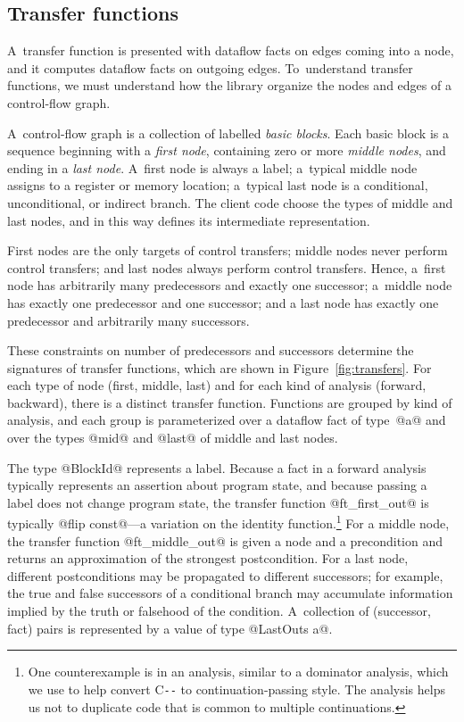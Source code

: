 \documentclass[blockstyle,preprint,natbib,nocopyrightspace]{sigplanconf}
\newcommand\PAL{\mbox{C{\texttt{-{}-}}}}
\newcommand{\authornote}[1]{{\em #1}}
\def\authornote#1{\unskip\relax}
\newcommand{\norman}[1]{\authornote{NR: #1}}
\let\remark\norman
\newcommand\secref[1]{Section~\ref{sec:#1}}
\newcommand\seclabel[1]{\label{sec:#1}}
\newcommand\figref[1]{Figure~\ref{fig:#1}}
\begin{document}
\subsection{Transfer functions} \seclabel{tffuns}

A~transfer function is presented with dataflow facts on edges coming
into a node, and it computes dataflow facts on outgoing edges.
To~understand transfer functions, we must 
understand how the library organize the nodes and edges of a control-flow graph.

\seclabel{graph.intro}

A~control-flow graph is a collection of labelled \emph{basic blocks}.
Each basic block is a sequence beginning with a \emph{first node},
containing zero or more \emph{middle nodes},
and ending in a \emph{last node}.
A~first node is always a label;
a~typical middle node assigns to a register or memory
location;
a~typical last node is a conditional, unconditional, or indirect branch.
The client code choose the types of middle and last nodes, and in this
way defines its intermediate
representation.
\remark{To say or not to say: ``(An~optimizer also works with \emph{subgraphs}, in which one or two
distinguished basic blocks may be incomplete.
Details appear in \secref{subgraphs}.)''}




First nodes are the only targets of control transfers;
middle nodes never perform control transfers;
and
last nodes always perform control transfers.
Hence, a~first node has arbitrarily many predecessors and exactly one
successor;
a~middle node has exactly one predecessor and one successor;
and a last node has exactly one predecessor and arbitrarily many
successors. 

These constraints on number of predecessors and successors determine
the signatures of 
transfer functions, 
which are shown in \figref{transfers}.
For each type of node (first, middle, last) and for each kind of
analysis (forward, backward), there is a distinct transfer function.
Functions are grouped by kind of analysis, and each group is
parameterized over a dataflow fact of type~@a@ and over the types
@mid@ and @last@ of middle and last nodes.  


The type @BlockId@ represents a label.
Because a fact in a forward analysis typically represents an assertion
about program state,
 and because passing a label does not change
program state, the transfer function @ft_first_out@ is typically 
@flip const@---a variation on
the
identity function.\footnote
{One counterexample is in an
analysis, similar to a dominator analysis,
which we use to help convert {\PAL} to continuation-passing style.
The  analysis
helps us not to duplicate code that is common to multiple continuations.
}
For a middle node, the transfer function @ft_middle_out@ is given a
node and a precondition and returns an approximation of the strongest
postcondition. 
For a last node, different postconditions may be propagated to
different successors; for example, the true and false successors of a
conditional branch may accumulate information implied by the truth or
falsehood of the condition.
A~collection of (successor, fact) pairs is represented by a value of
type @LastOuts a@.
\end{document}
